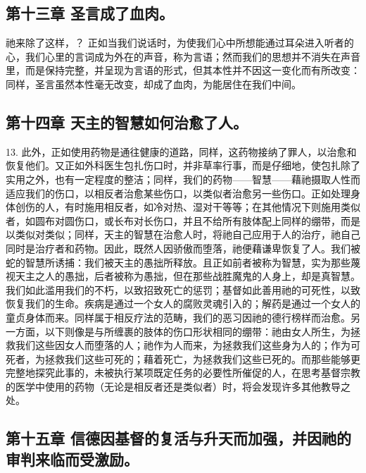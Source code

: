 \subsection{第十三章 圣言成了血肉。}

祂来除了这样，？ 正如当我们说话时，为使我们心中所想能通过耳朵进入听者的心，我们心里的言词成为外在的声音，称为言语；然而我们的思想并不消失在声音里，而是保持完整，并呈现为言语的形式，但其本性并不因这一变化而有所改变：同样，圣言虽然本性毫无改变，却成了血肉，为能居住在我们中间。\par


\subsection{第十四章 天主的智慧如何治愈了人。}

13. 此外，正如使用药物是通往健康的道路，同样，这药物接纳了罪人，以治愈和恢复他们。又正如外科医生包扎伤口时，并非草率行事，而是仔细地，使包扎除了实用之外，也有一定程度的整洁；同样，我们的药物——智慧——藉祂摄取人性而适应我们的伤口，以相反者治愈某些伤口，以类似者治愈另一些伤口。正如处理身体创伤的人，有时施用相反者，如冷对热、湿对干等等；在其他情况下则施用类似者，如圆布对圆伤口，或长布对长伤口，并且不给所有肢体配上同样的绷带，而是以类似对类似；同样，天主的智慧在治愈人时，将祂自己应用于人的治疗，祂自己同时是治疗者和药物。因此，既然人因骄傲而堕落，祂便藉谦卑恢复了人。我们被蛇的智慧所诱捕：我们被天主的愚拙所释放。且正如前者被称为智慧，实为那些蔑视天主之人的愚拙，后者被称为愚拙，但在那些战胜魔鬼的人身上，却是真智慧。我们如此滥用我们的不朽，以致招致死亡的惩罚；基督如此善用祂的可死性，以致恢复我们的生命。疾病是通过一个女人的腐败灵魂引入的；解药是通过一个女人的童贞身体而来。同样属于相反疗法的范畴，我们的恶习因祂的德行榜样而治愈。另一方面，以下则像是与所缠裹的肢体的伤口形状相同的绷带：祂由女人所生，为拯救我们这些因女人而堕落的人；祂作为人而来，为拯救我们这些身为人的；作为可死者，为拯救我们这些可死的；藉着死亡，为拯救我们这些已死的。而那些能够更完整地探究此事的，未被执行某项既定任务的必要性所催促的人，在思考基督宗教的医学中使用的药物（无论是相反者还是类似者）时，将会发现许多其他教导之处。\par


\subsection{第十五章 信德因基督的复活与升天而加强，并因祂的审判来临而受激励。}

